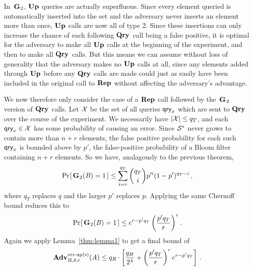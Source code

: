 In~$\textup{\textbf{G}}\hspace{0.5pt}_2$, $\textup{\textbf{Up}}\hspace{0.5pt}$ queries are actually superfluous. Since every element
queried is automatically inserted into the set and the adversary never inserts
an element more than once, $\textup{\textbf{Up}}\hspace{0.5pt}$ calls are now all of type 2. Since these
insertions can only increase the chance of each following $\textup{\textbf{Qry}}\hspace{0.5pt}$ call being a
false positive, it is optimal for the adversary to make all $\textup{\textbf{Up}}\hspace{0.5pt}$ calls at the
beginning of the experiment, and then to make all $\textup{\textbf{Qry}}\hspace{0.5pt}$ calls. But this means
we can assume without loss of generality that the adversary makes no $\textup{\textbf{Up}}\hspace{0.5pt}$
calls at all, since any elements added through $\textup{\textbf{Up}}\hspace{0.5pt}$ before any $\textup{\textbf{Qry}}\hspace{0.5pt}$ calls
are made could just as easily have been included in the original call to $\textup{\textbf{Rep}}\hspace{0.5pt}$
without affecting the adversary's advantage.

We now therefore only consider the case of a $\textup{\textbf{Rep}}\hspace{0.5pt}$ call followed by
the~$\textup{\textbf{G}}\hspace{0.5pt}_2$ version of $\textup{\textbf{Qry}}\hspace{0.5pt}$ calls. Let $\mathcal{X}$ be the set of all queries
$\mathsf{qry}_x$ which are sent to $\textup{\textbf{Qry}}\hspace{0.5pt}$ over the course of the experiment. We
necessarily have $|\mathcal{X}| \le q_T$, and each $\mathsf{qry}_x \in \mathcal{X}$ has some
probability of causing an error. Since $\mathcal{S}^*$ never grows to contain more than
$n+r$ elements, the false positive probability for each such $\mathsf{qry}_x$ is bounded
above by $p'$, the false-positive probability of a Bloom filter containing $n+r$
elements. So we have, analagously to the previous theorem,
\begin{equation}
   \Pr\hspace{-1pt}\left[\,\textup{\textbf{G}}\hspace{0.5pt}_2(\mathit{B})=1\,\right] \le
     \sum_{i=r}^{q_T} \binom{q_T}{i}p'^i(1-p')^{q_T-i} \,,
\end{equation}
where $q_T$ replaces $q$ and the larger $p'$ replaces $p$. Applying the same Chernoff bound reduces this to
\begin{equation}
   \Pr\hspace{-1pt}\left[\,\textup{\textbf{G}}\hspace{0.5pt}_2(\mathit{B})=1\,\right] \le
     e^{r-p'q_T}\left(\frac{p'q_T}{r}\right)^r.
\end{equation}
%
Again we apply Lemma~\ref{thm:lemma1} to get a final bound of
\begin{equation}
  \Adv{\erreps}_{\Pi,\delta,r}(\advA) \leq
    q_R \cdot \left[
      \frac{q_H}{2^\lambda} +
      \left(\frac{p'q_T}{r}\right)^re^{r-p'q_T}
    \right] \,.
\end{equation}
